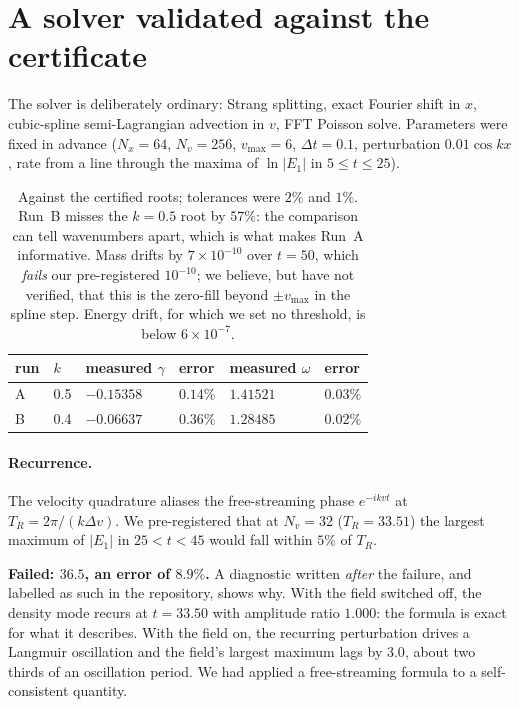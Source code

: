 \documentclass[11pt,a4paper]{article}
\begin{document}
\section{A solver validated against the certificate}
\label{sec:k2}

The solver is deliberately ordinary: Strang splitting, exact Fourier shift in $x$, cubic-spline
semi-Lagrangian advection in $v$, FFT Poisson solve. Parameters were fixed in advance
($N_x=64$, $N_v=256$, $v_{\max}=6$, $\Delta t=0.1$, perturbation $0.01\cos kx$, rate from a line through
the maxima of $\ln|E_1|$ in $5\le t\le25$).

\begin{table}[h]\centering\small
\begin{tabular}{@{}llllll@{}}
\toprule
run & $k$ & measured $\gamma$ & error & measured $\omega$ & error \\
\midrule
A & 0.5 & $-0.15358$ & $0.14\%$ & $1.41521$ & $0.03\%$ \\
B & 0.4 & $-0.06637$ & $0.36\%$ & $1.28485$ & $0.02\%$ \\
\bottomrule
\end{tabular}
\caption{Against the certified roots; tolerances were $2\%$ and $1\%$. Run~B misses the $k=0.5$ root by
$57\%$: the comparison can tell wavenumbers apart, which is what makes Run~A informative. Mass drifts by $7\times10^{-10}$ over $t=50$, which \emph{fails} our pre-registered $10^{-10}$; we believe, but have
not verified, that this is the zero-fill beyond $\pm v_{\max}$ in the spline step. Energy drift, for which we set no
threshold, is below $6\times10^{-7}$.}
\end{table}

\paragraph{Recurrence.} The velocity quadrature aliases the free-streaming phase $e^{-ikvt}$ at
$T_R=2\pi/(k\Delta v)$. We pre-registered that at $N_v=32$ ($T_R=33.51$) the largest maximum of $|E_1|$
in $25<t<45$ would fall within $5\%$ of $T_R$.

\begin{failbox}
\textbf{Failed: $36.5$, an error of $8.9\%$.} A diagnostic written \emph{after} the failure, and
labelled as such in the repository, shows why. With the field switched off, the density mode recurs at
$t=33.50$ with amplitude ratio $1.000$: the formula is exact for what it describes. With the field on,
the recurring perturbation drives a Langmuir oscillation and the field's largest maximum lags by $3.0$,
about two thirds of an oscillation period. We had applied a free-streaming formula to a self-consistent
quantity.
\end{failbox}
\end{document}
